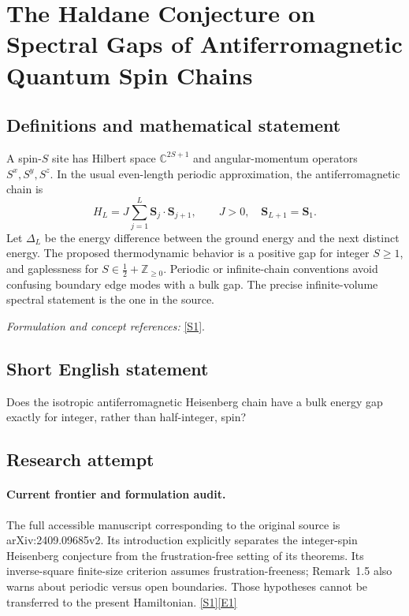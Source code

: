 \documentclass[11pt,a4paper]{article}
\newcommand{\Z}{\mathbb{Z}}
\newcommand{\C}{\mathbb{C}}
\newcommand{\sref}[2]{\hyperlink{source:#1:#2}{[S#2]}}
\newcommand{\eref}[2]{\hyperlink{extra:#1:#2}{[E#2]}}
\newif\ifshowcatalogue
\newcommand{\cataloguescope}[1]{\ifshowcatalogue
 \paragraph{Exact scope in the supplied catalogue.}
 \begin{quote}\small #1\end{quote}\fi}
\numberwithin{equation}{section}
\begin{document}
\setcounter{section}{0}
\clearpage
\section*{\texorpdfstring{The Haldane Conjecture on Spectral Gaps of Antiferromagnetic Quantum Spin Chains}{The Haldane Conjecture on Spectral Gaps of Antiferromagnetic Quantum Spin Chains}}\label{statement}
\subsection{Definitions and mathematical statement}
A spin-$S$ site has Hilbert space $\C^{2S+1}$ and angular-momentum operators $S^x,S^y,S^z$. In the usual even-length periodic approximation, the antiferromagnetic chain is
\[
 H_L=J\sum_{j=1}^{L}\mathbf S_j\cdot\mathbf S_{j+1},\qquad J>0,\quad\mathbf S_{L+1}=\mathbf S_1.
\]
Let $\Delta_L$ be the energy difference between the ground energy and the next distinct energy. The proposed thermodynamic behavior is a positive gap for integer $S\ge1$, and gaplessness for $S\in\tfrac12+\Z_{\ge0}$. Periodic or infinite-chain conventions avoid confusing boundary edge modes with a bulk gap. The precise infinite-volume spectral statement is the one in the source.
\par\smallskip\textit{Formulation and concept references:} \sref{statement}{1}.
\cataloguescope{Prove that the one-dimensional isotropic antiferromagnetic Heisenberg chain has a positive spectral gap for every integer spin S >= 1 and is gapless for every half-integer spin.}
\subsection{Short English statement}
Does the isotropic antiferromagnetic Heisenberg chain have a bulk energy gap exactly for integer, rather than half-integer, spin?
\subsection{Research attempt}

\paragraph{Current frontier and formulation audit.}
The full accessible manuscript corresponding to the original source is
arXiv:2409.09685v2. Its introduction explicitly separates the integer-spin
Heisenberg conjecture from the frustration-free setting of its theorems.
Its inverse-square finite-size criterion assumes frustration-freeness;
Remark~1.5 also warns about periodic versus open boundaries. Those hypotheses
cannot be transferred to the present Hamiltonian. \sref{statement}{1}\eref{statement}{1}
\end{document}
